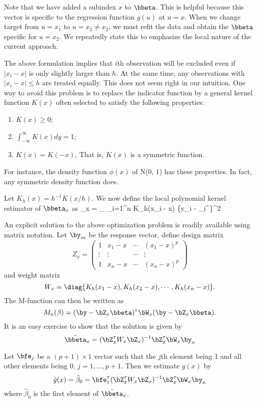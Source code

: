 Note that we have added a subindex $x$ to $\bbeta$.
This is helpful because this vector is specific to the regression
function $g(u)$ at $u=x$. When we change target from $u=x_1$
to $u=x_2 \neq x_2$, we must refit the data and obtain
the $\bbeta$ specific for $u = x_2$. We repeatedly state this
to emphasize the local nature of the current approach.

The above formulation implies that $i$th observation will
be excluded even if $|x_i - x|$ is only slightly larger than $h$.
At the same time, any observations with $|x_i - x|\leq h$
are treated equally. This does not seem right in our intuition.
One way to avoid this problem is to
replace the indicator function by a general kernel function
$K(x)$ often selected to satisfy the following properties:
\begin{enumerate}
\item 
$K(x)\geq0$;
\item 
$\int_{-\infty}^\infty K(x)dy=1$;
\item 
$K(x)=K(-x)$, That is, $K(x)$ is a symmetric function. 
\end{enumerate}
For instance, the density function $\phi(x)$ of N(0, 1)
has these properties. In fact, any symmetric density function
does.

Let $K_h(x) = h^{-1} K(x/h)$. We now define the 
local polynomial kernel estimator of $\bbeta_x$ as
\bea
\hat \bbeta_x
=
\arg \min_{\bbeta}
\sum_{i=1}^{n} K_h(x_i - x) \{y_i - \bz_i^\tau \bbeta \}^2
\eea

An explicit solution to the above optimization problem 
is readily available using matrix notation.
Let $\by_m$ be the response vector,
define design matrix
\[
Z_x
=
\left(
\begin{array}{cccc}
1 & x_1-x &\cdots& (x_1-x)^p \\
\vdots&\vdots&\cdots&\vdots\\
1&x_n-x&\cdots&(x_n-x)^p
\end{array}
\right )
\]
and weight matrix
\[
W_x =
\diag \{
K_h(x_1-x), K_h(x_2 - x), \cdots,  K_h(x_n-x) \}.
\]
The M-function can then be written as
\[
M_n(\beta) = (\by-\bZ_x\bbeta)^\tau \bW_x (\by-\bZ_x\bbeta).
\]
It is an easy exercise to show that the solution is given
by
\[
\hat \bbeta_x= (\bZ^\tau_x W_x \bZ _x)^{-1}\bZ^\tau_x \bW_x \by_n
\]

Let $\bfe_j$ be a $(p+1)\times 1$ vector such that 
the $j$th element being 1 and all other elements being 0, $j=1,\ldots,p+1$.  
Then we estimate $g(x)$ by
\[
\hat g(x)
=
\hat \beta_0
=
{\bfe}_1^\tau (\bZ^\tau_x W_x \bZ _x)^{-1}\bZ^\tau_x \bW_x \by_n
\]
where $\hat \beta_0$ is the first element of $\hat \bbeta_x$.

